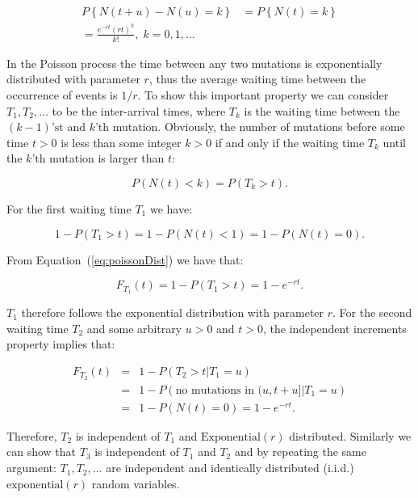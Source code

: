 \newpage

\begin{align}
P\left\{ N(t+u)-N(u)=k\right\} & = P\left\{ N(t)=k\right\} \nonumber \\
= \frac{e^{-r t}(r t)^{k}}{k!},\; k=0,1,\ldots
\label{eq:poissonDist} 
\end{align}

In the Poisson process the time between any two mutations is exponentially distributed with parameter $r$, thus the average waiting time between the occurrence of events is $1/r$.
To show this important property we can consider $T_1,T_2,\ldots$ to be the inter-arrival times, where $T_k$ is the waiting time between the $(k-1)\text{'st}$ and $k\text{'th}$ mutation. 
Obviously, the number of mutations before some time $t>0$ is less than some integer $k>0$ if and only if the waiting time $T_k$ until the $k\text{'th}$ mutation is larger than $t$:

\begin{equation}
P\left(N(t)<k\right)=P\left(T_{k}>t\right).
\end{equation}

\noindent
For the first waiting time $T_1$ we have:

\begin{equation}
1-P\left(T_{1}>t\right)=1-P\left(N(t)<1\right)=1-P\left(N(t)=0\right).
\end{equation}

\noindent
From Equation~(\ref{eq:poissonDist}) we have that:

\begin{equation}
F_{T_{1}}(t)=1-P\left(T_{1}>t\right)=1-e^{-r t}.
\end{equation}

\noindent
$T_1$ therefore follows the exponential distribution with parameter $r$.
For the second waiting time $T_2$ and some arbitrary $u>0$ and $t>0$, the independent increments property implies that:

\begin{eqnarray}
F_{T_{2}}(t) &=& 1-P\left(T_{2}>t|T_{1}=u\right) \nonumber \\
& = & 1-P\left(\text{no mutations in }(u,t+u]|T_{1}=u\right) \nonumber \\ 
& = & 1-P\left(N(t)=0\right)=1-e^{-r t}.
\end{eqnarray}

\noindent
Therefore, $T_2$ is independent of $T_1$ and $\text{Exponential}(r)$ distributed. 
Similarly we can show that $T_3$ is independent of $T_1$ and $T_2$ and by repeating the same argument: $T_1,T_2,\ldots$ are independent and identically distributed (i.i.d.) $\text{exponential}(r)$ random variables.

